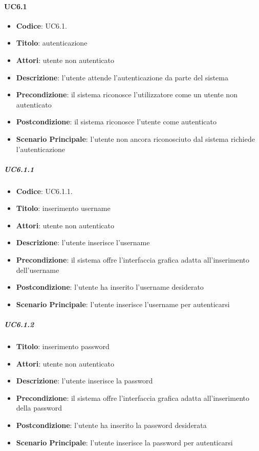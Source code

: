 	\paragraph{UC6.1}%
		\begin{itemize}
			\item \textbf{Codice}: UC6.1.
			\item \textbf{Titolo}: autenticazione
			\item \textbf{Attori}: utente non autenticato
			\item \textbf{Descrizione}: l'utente attende l'autenticazione da parte del sistema
			\item \textbf{Precondizione}: il sistema riconosce l'utilizzatore come un utente non autenticato
			\item \textbf{Postcondizione}: il sistema riconosce l'utente come autenticato
			\item \textbf{Scenario Principale}: l’utente non ancora riconosciuto dal sistema richiede l'autenticazione
	\end{itemize}
		\subparagraph{UC6.1.1}
			\begin{itemize}
			\item \textbf{Codice}: UC6.1.1.	
			\item \textbf{Titolo}: inserimento username
			\item \textbf{Attori}: utente non autenticato
			\item \textbf{Descrizione}: l'utente inserisce l'username
			\item \textbf{Precondizione}: il sistema offre l'interfaccia grafica adatta all'inserimento dell'username
			\item \textbf{Postcondizione}: l'utente ha inserito l'username desiderato
			\item \textbf{Scenario Principale}: l'utente inserisce l'username per autenticarsi
		\end{itemize}
		\subparagraph{UC6.1.2}
			\begin{itemize}
			\item \textbf{Titolo}: inserimento password
			\item \textbf{Attori}: utente non autenticato
			\item \textbf{Descrizione}: l'utente inserisce la password
			\item \textbf{Precondizione}: il sistema offre l'interfaccia grafica adatta all'inserimento della password
			\item \textbf{Postcondizione}: l'utente ha inserito la password desiderata
			\item \textbf{Scenario Principale}: l'utente inserisce la password per autenticarsi
		\end{itemize}
	
